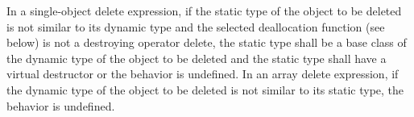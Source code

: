\pnum
{}%
In a single-object delete expression, if the static type of the object to be
deleted is not similar to its dynamic type
and the selected deallocation function (see below)
is not a destroying operator delete,
the static type shall be a base
class of the dynamic type of the object to be deleted and the static type shall
have a virtual destructor or the behavior is undefined. In an array delete
%
%
%
%
%
expression, if the dynamic type of the object to be deleted is not similar to
its static type, the behavior is undefined.
%
%
%
%
%

